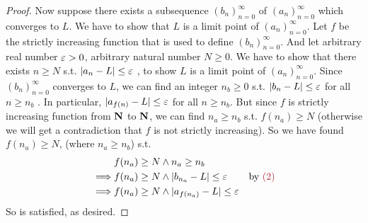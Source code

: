 \begin{proof}
Now suppose there exists a subsequence \((b_n)_{n = 0}^{\infty}\) of \((a_n)_{n = 0}^{\infty}\) which converges to \(L\).
We have to show that \(L\) is a limit point of \((a_n)_{n = 0}^{\infty}\).
Let \(f\) be the strictly increasing function that is used to define \((b_n)_{n = 0}^{\infty}\).
And let arbitrary real number \(\varepsilon > 0\), arbitrary natural number \(N \ge 0\).
We have to show that there exists \(n \ge N\) s.t. \(\lvert a_n - L\rvert \le \varepsilon\) , to show \(L\) is a limit point of \((a_n)_{n = 0}^{\infty}\).
Since \((b_n)_{n = 0}^{\infty}\) converges to \(L\), we can find an integer \(n_b \ge 0\) s.t. \(\lvert b_n - L\rvert \le \varepsilon\) for all \(n \ge n_b\) .
In particular, \(\lvert a_{f(n)} - L\rvert \le \varepsilon\) for all \(n \ge n_b\).
But since \(f\) is strictly increasing function from \(\mathbf{N}\) to \(\mathbf{N}\), we can find \(n_a \ge n_b\) s.t. \(f(n_a) \ge N\) (otherwise we will get a contradiction that \(f\) is not strictly increasing).
So we have found \(f(n_a) \ge N\), (where \(n_a \ge n_b\)) s.t.
\begin{align*}
             & f(n_a) \ge N \land n_a \ge n_b \\
    \implies & f(n_a) \ge N \land \abs{b_{n_a} - L} \le \varE & \text{by \MAROON{(2)}} \\
    \implies & f(n_a) \ge N \land \abs{a_{f(n_a)} - L} \le \varE
\end{align*}
So  is satisfied, as desired.
\end{proof}